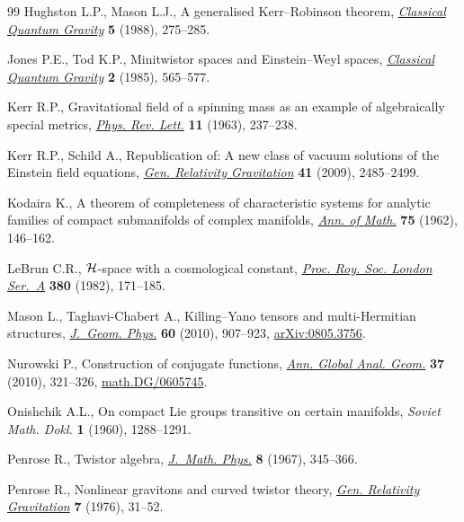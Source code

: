 \documentclass[pdftex]{sigma}
\numberwithin{equation}{section}
\begin{document}
\begin{thebibliography}{99}
Hughston L.P., Mason L.J., A generalised {K}err--{R}obinson theorem,
 \href{http://dx.doi.org/10.1088/0264-9381/5/2/007}{\textit{Classical Quantum Gravity}} \textbf{5} (1988), 275--285.

Jones P.E., Tod K.P., Minitwistor spaces and {E}instein--{W}eyl spaces,
 \href{http://dx.doi.org/10.1088/0264-9381/2/4/021}{\textit{Classical Quantum Gravity}} \textbf{2} (1985), 565--577.

Kerr R.P., Gravitational f\/ield of a spinning mass as an example of
 algebraically special metrics, \href{http://dx.doi.org/10.1103/PhysRevLett.11.237}{\textit{Phys. Rev. Lett.}} \textbf{11} (1963),
 237--238.

Kerr R.P., Schild A., Republication of: {A} new class of vacuum solutions of
 the {E}instein f\/ield equations, \href{http://dx.doi.org/10.1007/s10714-009-0857-z}{\textit{Gen. Relativity Gravitation}}
 \textbf{41} (2009), 2485--2499.

Kodaira K., A theorem of completeness of characteristic systems for analytic
 families of compact submanifolds of complex manifolds, \href{http://dx.doi.org/10.2307/1970424}{\textit{Ann. of Math.}}
 \textbf{75} (1962), 146--162.

LeBrun C.R., {${\cal H}$}-space with a cosmological constant, \href{http://dx.doi.org/10.1098/rspa.1982.0035}{\textit{Proc.
 Roy. Soc. London Ser.~A}} \textbf{380} (1982), 171--185.

Mason L., Taghavi-Chabert A., Killing--{Y}ano tensors and multi-{H}ermitian
 structures, \href{http://dx.doi.org/10.1016/j.geomphys.2010.02.008}{\textit{J.~Geom. Phys.}} \textbf{60} (2010), 907--923,
 \href{http://arxiv.org/abs/0805.3756}{arXiv:0805.3756}.

Nurowski P., Construction of conjugate functions, \href{http://dx.doi.org/10.1007/s10455-009-9186-4}{\textit{Ann. Global Anal.
 Geom.}} \textbf{37} (2010), 321--326, \href{http://arxiv.org/abs/math.DG/0605745}{math.DG/0605745}.

Onishchik A.L., On compact {L}ie groups transitive on certain manifolds,
 \textit{Soviet Math. Dokl.} \textbf{1} (1960), 1288--1291.

Penrose R., Twistor algebra, \href{http://dx.doi.org/10.1063/1.1705200}{\textit{J.~Math. Phys.}} \textbf{8} (1967),
 345--366.

Penrose R., Nonlinear gravitons and curved twistor theory, \href{http://dx.doi.org/10.1007/BF00762011}{\textit{Gen.
 Relativity Gravitation}} \textbf{7} (1976), 31--52.


\end{thebibliography}
\end{document}
